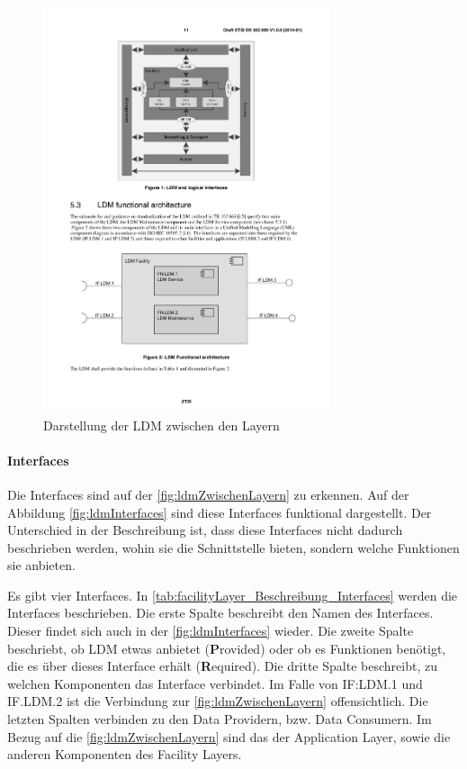\begin{figure}[htbp]
	\includegraphics[width=0.75\textwidth]{content/images/04_facilitylayer/ldmLayer.pdf}
	\caption{Darstellung der LDM zwischen den Layern \cite{en302895}}
	\label{fig:ldmZwischenLayern}
\end{figure}

\paragraph{Interfaces}
Die Interfaces sind auf der \autoref{fig:ldmZwischenLayern} zu erkennen. Auf der Abbildung \autoref{fig:ldmInterfaces} sind diese Interfaces funktional dargestellt. Der Unterschied in der Beschreibung ist, dass diese Interfaces nicht dadurch beschrieben werden, wohin sie die Schnittstelle bieten, sondern welche Funktionen sie anbieten.

Es gibt vier Interfaces. In \autoref{tab:facilityLayer_Beschreibung_Interfaces} werden die Interfaces beschrieben. Die erste Spalte beschreibt den Namen des Interfaces. Dieser findet sich auch in der \autoref{fig:ldmInterfaces} wieder. Die zweite Spalte beschriebt, ob \ac{LDM} etwas anbietet (\textbf{P}rovided) oder ob es Funktionen benötigt, die es über dieses Interface erhält (\textbf{R}equired). Die dritte Spalte beschreibt, zu welchen Komponenten das Interface verbindet. Im Falle von IF:LDM.1 und IF.LDM.2 ist die Verbindung zur \autoref{fig:ldmZwischenLayern} offensichtlich. Die letzten Spalten verbinden zu den Data Providern, bzw. Data Consumern. Im Bezug auf die \autoref{fig:ldmZwischenLayern} sind das der Application Layer, sowie die anderen Komponenten des Facility Layers. 

